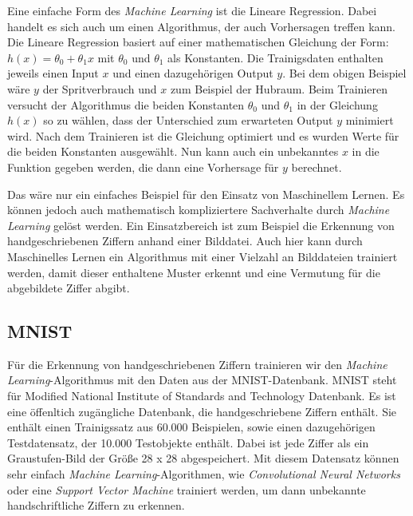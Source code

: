 Eine einfache Form des \textit{Machine Learning} ist die Lineare Regression. Dabei handelt es sich auch um einen Algorithmus, der auch Vorhersagen treffen kann.
Die Lineare Regression basiert auf einer mathematischen Gleichung der Form: $h(x) = \theta_0 + \theta_1x $ mit $\theta_0$ und $\theta_1$ als Konstanten.
Die Trainigsdaten enthalten jeweils einen Input $x$ und einen dazugehörigen Output $y$. Bei dem obigen Beispiel wäre $y$ der Spritverbrauch und $x$ zum Beispiel der
Hubraum. Beim Trainieren versucht der Algorithmus die beiden Konstanten $\theta_0$ und $\theta_1$ in der Gleichung $h(x)$ so zu wählen, 
dass der Unterschied zum erwarteten Output $y$ minimiert wird. Nach dem Trainieren ist die Gleichung optimiert und es wurden Werte für die beiden Konstanten ausgewählt.
Nun kann auch ein unbekanntes $x$ in die Funktion gegeben werden, die dann eine Vorhersage für $y$ berechnet.\cite{simon_2015}

Das wäre nur ein einfaches Beispiel für den Einsatz von Maschinellem Lernen. Es können jedoch auch mathematisch kompliziertere Sachverhalte durch \textit{Machine Learning}
gelöst werden. Ein Einsatzbereich ist zum Beispiel die Erkennung von handgeschriebenen Ziffern anhand einer Bilddatei. Auch hier kann durch Maschinelles Lernen ein
Algorithmus mit einer Vielzahl an Bilddateien trainiert werden, damit dieser enthaltene Muster erkennt und eine Vermutung für die abgebildete Ziffer abgibt. 

\subsection{MNIST}
Für die Erkennung von handgeschriebenen Ziffern trainieren wir den \textit{Machine Learning}-Algorithmus mit den Daten aus der MNIST-Datenbank.
MNIST steht für Modified National Institute of Standards and Technology Datenbank. 
Es ist eine öffenltich zugängliche Datenbank, die handgeschriebene Ziffern enthält.
Sie enthält einen Trainigssatz aus 60.000 Beispielen, sowie einen dazugehörigen Testdatensatz, der 10.000 Testobjekte enthält.
Dabei ist jede Ziffer als ein Graustufen-Bild der Größe 28 x 28 abgespeichert.
Mit diesem Datensatz können sehr einfach \textit{Machine Learning}-Algorithmen, wie \textit{Convolutional Neural Networks} oder eine \textit{Support Vector Machine} trainiert
werden, um dann unbekannte handschriftliche Ziffern zu erkennen.
